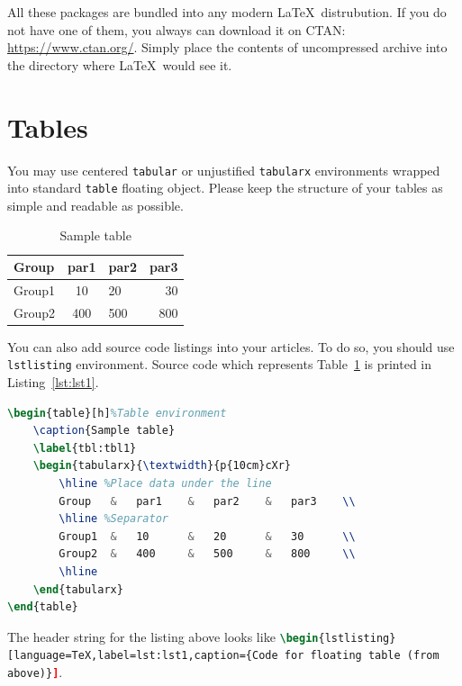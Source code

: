 \documentclass{flossiner}
\begin{document}
All these packages are bundled into any modern \LaTeX\ distrubution. If you do not have one of them, you always can download it on CTAN: \href{https://www.ctan.org/}{https://www.ctan.org/}. Simply place the contents of uncompressed archive into the directory where \LaTeX\ would see it.

\section{Tables}
You may use centered \texttt{tabular} or unjustified \texttt{tabularx} environments wrapped into standard \texttt{table} floating object. Please keep the structure of your tables as simple and readable as possible.
\begin{table}[h]
	\caption{Sample table}
	\label{tbl:tbl1}
		\begin{tabularx}{\textwidth}{p{10cm}cXr}
			\hline
			Group	&	par1	&	par2	&	par3	\\
			\hline
			Group1	&	10		&	20		&	30		\\
			Group2	&	400		&	500		&	800		\\
			\hline
		\end{tabularx}
\end{table}

You can also add source code listings into your articles. To do so, you should use \texttt{lstlisting} environment. Source code which represents Table~\ref{tbl:tbl1} is printed in Listing~\ref{lst:lst1}.

\begin{lstlisting}[language=TeX,label=lst:lst1,caption={Code for floating table (from above)}]
\begin{table}[h]%Table environment
	\caption{Sample table}
	\label{tbl:tbl1}
	\begin{tabularx}{\textwidth}{p{10cm}cXr}
		\hline %Place data under the line
		Group	&	par1	&	par2	&	par3	\\
		\hline %Separator
		Group1	&	10		&	20		&	30		\\
		Group2	&	400		&	500		&	800		\\
		\hline
	\end{tabularx}
\end{table}
\end{lstlisting}

The header string for the listing above looks like \lstinline[language=TeX]|\begin{lstlisting}[language=TeX,label=lst:lst1,caption={Code for floating table (from above)}]|.
\end{document}
